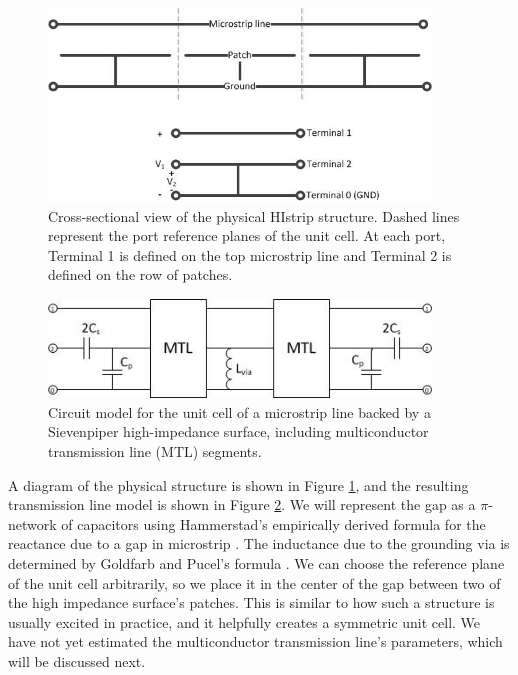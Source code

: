 \documentclass{allertonproc}
\begin{document}
\begin{figure}[tbp]
\begin{center}
\includegraphics[width=4in]{physstructure}
\caption{Cross-sectional view of the physical HIstrip structure.  Dashed lines represent the port reference planes of the unit cell.  At each port, Terminal 1 is defined on the top microstrip line and Terminal 2 is defined on the row of patches.}
\label{physicalstructure}
\end{center}
\end{figure}
\begin{figure}[thb]
\begin{center}
\includegraphics[width=4in]{MTL_circuitmodel}
\caption{Circuit model for the unit cell of a microstrip line backed by a Sievenpiper high-impedance surface, including multiconductor transmission line (MTL) segments.  }
\label{tlmodel}
\end{center}
\end{figure}
A diagram of the physical structure is shown in Figure \ref{physicalstructure},  and the resulting transmission line model is shown in Figure \ref{tlmodel}. We will represent the gap as a $\pi$-network of capacitors using Hammerstad's empirically derived formula for the reactance due to a gap in microstrip \cite{hammerstad}.  The inductance due to the grounding via is determined by Goldfarb and Pucel's formula \cite{goldfarb}.  We can choose the reference plane of the unit cell arbitrarily, so we place it in the center of the gap between two of the high impedance surface's patches.  This is similar to how such a structure is usually excited in practice, and it helpfully creates a symmetric unit cell.  We have not yet estimated the multiconductor transmission line's parameters, which will be discussed next.
\end{document}
